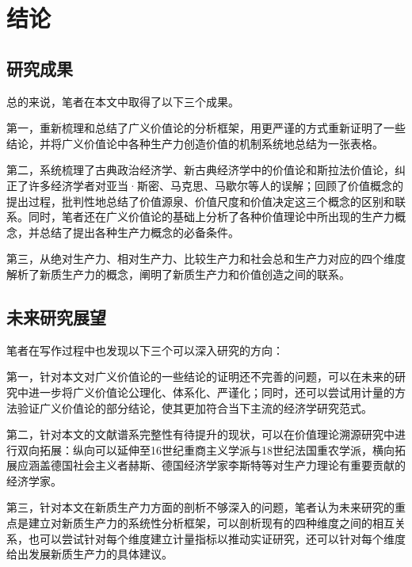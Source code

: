 
\chapter{结论}

\section{研究成果}

总的来说，笔者在本文中取得了以下三个成果。

第一，重新梳理和总结了广义价值论的分析框架，用更严谨的方式重新证明了一些结论，并将广义价值论中各种生产力创造价值的机制系统地总结为一张表格。

第二，系统梳理了古典政治经济学、新古典经济学中的价值论和斯拉法价值论，纠正了许多经济学者对亚当·斯密、马克思、马歇尔等人的误解；回顾了价值概念的提出过程，批判性地总结了价值源泉、价值尺度和价值决定这三个概念的区别和联系。同时，笔者还在广义价值论的基础上分析了各种价值理论中所出现的生产力概念，并总结了提出各种生产力概念的必备条件。

第三，从绝对生产力、相对生产力、比较生产力和社会总和生产力对应的四个维度解析了新质生产力的概念，阐明了新质生产力和价值创造之间的联系。

\section{未来研究展望}

笔者在写作过程中也发现以下三个可以深入研究的方向：

第一，针对本文对广义价值论的一些结论的证明还不完善的问题，可以在未来的研究中进一步将广义价值论公理化、体系化、严谨化；同时，还可以尝试用计量的方法验证广义价值论的部分结论，使其更加符合当下主流的经济学研究范式。

第二，针对本文的文献谱系完整性有待提升的现状，可以在价值理论溯源研究中进行双向拓展：纵向可以延伸至16世纪重商主义学派与18世纪法国重农学派，横向拓展应涵盖德国社会主义者赫斯、德国经济学家李斯特\cite[33]{YangQiaoYuShengChanLiGaiNianCongSiMiDaoMaKeSiDeSiXiangPuXi2013}等对生产力理论有重要贡献的经济学家。

第三，针对本文在新质生产力方面的剖析不够深入的问题，笔者认为未来研究的重点是建立对新质生产力的系统性分析框架，可以剖析现有的四种维度之间的相互关系，也可以尝试针对每个维度建立计量指标以推动实证研究，还可以针对每个维度给出发展新质生产力的具体建议。